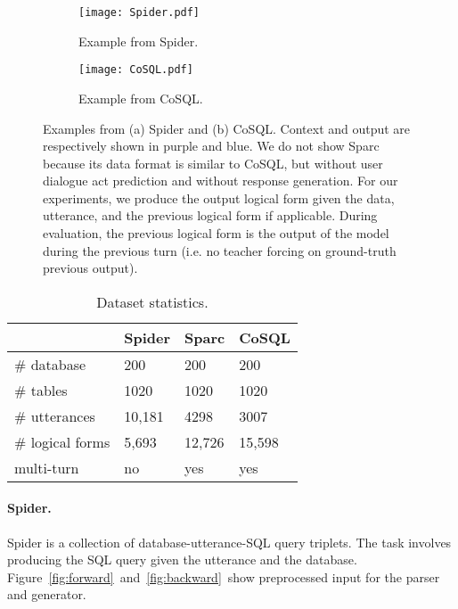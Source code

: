 \documentclass[11pt,a4paper]{article}
\begin{document}
\begin{figure*}[t]
\centering
\begin{subfigure}[b]{0.95\linewidth}
   \texttt{[image: Spider.pdf]}
   \caption{Example from Spider.}
   \label{fig:spider}
\end{subfigure}
\begin{subfigure}[b]{0.95\linewidth}
   \texttt{[image: CoSQL.pdf]}
   \caption{Example from CoSQL.}
   \label{fig:cosql}
\end{subfigure}
\vspace{-0.15in}
\caption{
Examples from (a) Spider and (b) CoSQL.
Context and output are respectively shown in purple and blue.
We do not show Sparc because its data format is similar to CoSQL, but without user dialogue act prediction and without response generation.
For our experiments, we produce the output logical form given the data, utterance, and the previous logical form if applicable.
During evaluation, the previous logical form is the output of the model during the previous turn (i.e. no teacher forcing on ground-truth previous output).
}
\vspace{-0.1in}
\label{fig:datasets}
\end{figure*}

\begin{table}[t]
\centering
\begin{tabularx}{\linewidth}{llll}
\toprule
                 & Spider & Sparc  & CoSQL  \\ \midrule
\# database      & 200    & 200    & 200    \\
\# tables        & 1020   & 1020   & 1020   \\
\# utterances    & 10,181 & 4298   & 3007   \\
\# logical forms & 5,693  & 12,726 & 15,598 \\
multi-turn       & no     & yes    & yes    \\ \bottomrule
\end{tabularx}
\vspace{-0.12in}
\caption{Dataset statistics.}
\vspace{-0.10in}
\label{tab:datasets}
\vspace{-0.15in}
\end{table}



\paragraph{Spider.}
Spider is a collection of database-utterance-SQL query triplets.
The task involves producing the SQL query given the utterance and the database.
Figure~\ref{fig:forward}~and~\ref{fig:backward}~show preprocessed input for the parser and generator.
\end{document}
